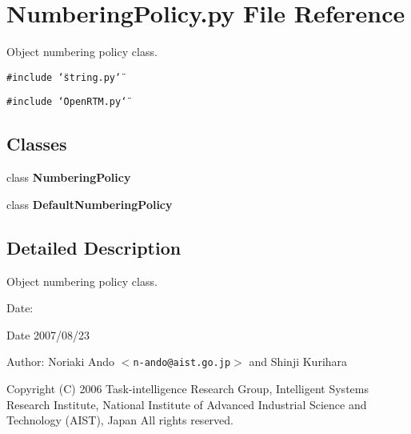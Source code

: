 \section{Numbering\-Policy.py File Reference}
\label{NumberingPolicy_8py}
Object numbering policy class. 

{\tt \#include \char`\"{}string.py\char`\"{}}\par
{\tt \#include \char`\"{}Open\-RTM.py\char`\"{}}\par
\subsection*{Classes}
\begin{CompactItemize}
\item 
class {\bf Numbering\-Policy}
\item 
class {\bf Default\-Numbering\-Policy}
\end{CompactItemize}


\subsection{Detailed Description}
Object numbering policy class. 

\begin{Desc}
\item[Date:]\begin{Desc}
\item[Date]2007/08/23\end{Desc}
\end{Desc}
\begin{Desc}
\item[Author:]Noriaki Ando $<${\tt n-ando@aist.go.jp}$>$ and Shinji Kurihara\end{Desc}
Copyright (C) 2006 Task-intelligence Research Group, Intelligent Systems Research Institute, National Institute of Advanced Industrial Science and Technology (AIST), Japan All rights reserved.